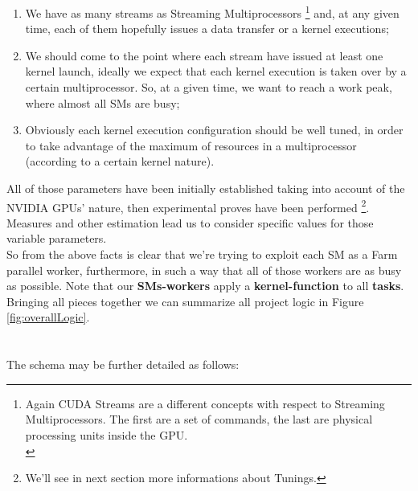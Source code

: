 	\begin{enumerate}
		\item We have as many streams as Streaming Multiprocessors \footnote{Again CUDA Streams are a different concepts with respect to Streaming Multiprocessors. The first are a set of commands, the last are physical processing units inside the GPU.\\} and, at any given time, each of them hopefully issues a data transfer or a kernel executions;
		\item We should come to the point where each stream have issued at least one kernel launch, ideally we expect that each kernel execution is taken over by a certain multiprocessor. So, at a given time, we want to reach a work peak, where almost all SMs are busy;
		\item Obviously each kernel execution configuration should be well tuned, in order to take advantage of the maximum of resources in a multiprocessor (according to a certain kernel nature). 
	\end{enumerate}
	

	All of those parameters have been initially established taking into account of the NVIDIA GPUs' nature, then experimental proves have been performed \footnote{We'll see in next section more informations about Tunings.}. Measures and other estimation lead us to consider specific values for those variable parameters.\\
	So from the above facts is clear that we're trying to exploit each SM as a Farm parallel worker, furthermore, in such a way that all of those workers are as busy as possible. Note that our \textbf{SMs-workers} apply a \textbf{kernel-function} to all \textbf{tasks}.\\
	Bringing all pieces together we can summarize all project logic in Figure \ref{fig:overallLogic}.\\\\\\
	The schema may be further detailed as follows:
				

